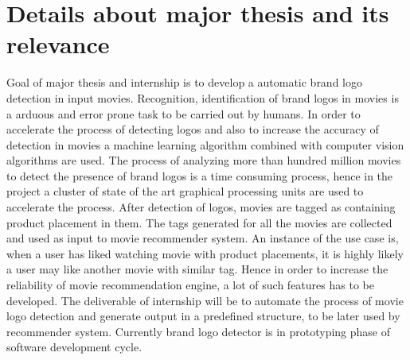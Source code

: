 \section{Details about major thesis and its relevance}
 Goal of major thesis and internship is to develop a automatic brand logo detection in input movies. Recognition, identification of brand logos in movies is a arduous and error prone task to be carried out by humans. In order to accelerate the process of detecting logos and also to increase the accuracy of detection in movies a machine learning algorithm combined with computer vision algorithms are used. The process of analyzing more than hundred million movies to detect the presence of brand logos is a time consuming process, hence in the project a cluster of state of the art graphical processing units are used to accelerate the process. After detection of logos, movies are tagged as containing product placement in them. The tags generated for all the movies are collected and used as input to movie recommender system. An instance of the use case is, when a user has liked watching movie with product placements, it is highly likely a user may like another movie with similar tag. Hence in order to increase the reliability of movie recommendation engine, a lot of such features has to be developed. The deliverable of internship will be to automate the process of movie logo detection and generate output in a predefined structure, to be later used by recommender system. Currently brand logo detector is in prototyping phase of software development cycle.

